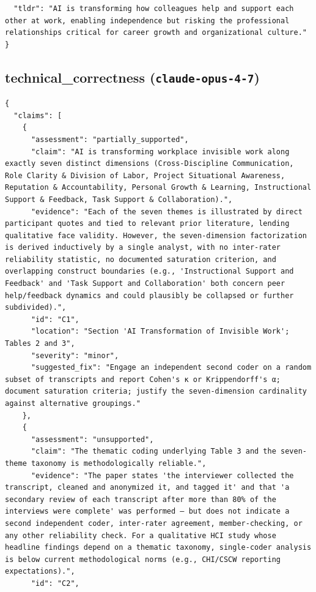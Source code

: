 \documentclass[11pt]{article}
\begin{document}
\begin{verbatim}
  "tldr": "AI is transforming how colleagues help and support each other at work, enabling independence but risking the professional relationships critical for career growth and organizational culture."
}
\end{verbatim}

\subsection*{technical_correctness (\texttt{claude-opus-4-7})}
\begin{verbatim}
{
  "claims": [
    {
      "assessment": "partially_supported",
      "claim": "AI is transforming workplace invisible work along exactly seven distinct dimensions (Cross-Discipline Communication, Role Clarity & Division of Labor, Project Situational Awareness, Reputation & Accountability, Personal Growth & Learning, Instructional Support & Feedback, Task Support & Collaboration).",
      "evidence": "Each of the seven themes is illustrated by direct participant quotes and tied to relevant prior literature, lending qualitative face validity. However, the seven-dimension factorization is derived inductively by a single analyst, with no inter-rater reliability statistic, no documented saturation criterion, and overlapping construct boundaries (e.g., 'Instructional Support and Feedback' and 'Task Support and Collaboration' both concern peer help/feedback dynamics and could plausibly be collapsed or further subdivided).",
      "id": "C1",
      "location": "Section 'AI Transformation of Invisible Work'; Tables 2 and 3",
      "severity": "minor",
      "suggested_fix": "Engage an independent second coder on a random subset of transcripts and report Cohen's κ or Krippendorff's α; document saturation criteria; justify the seven-dimension cardinality against alternative groupings."
    },
    {
      "assessment": "unsupported",
      "claim": "The thematic coding underlying Table 3 and the seven-theme taxonomy is methodologically reliable.",
      "evidence": "The paper states 'the interviewer collected the transcript, cleaned and anonymized it, and tagged it' and that 'a secondary review of each transcript after more than 80% of the interviews were complete' was performed — but does not indicate a second independent coder, inter-rater agreement, member-checking, or any other reliability check. For a qualitative HCI study whose headline findings depend on a thematic taxonomy, single-coder analysis is below current methodological norms (e.g., CHI/CSCW reporting expectations).",
      "id": "C2",

\end{verbatim}
\end{document}
